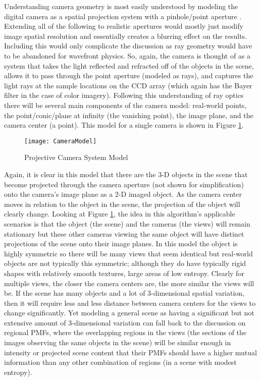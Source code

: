 Understanding camera geometry is most easily understood by modeling the digital camera as a spatial projection system with a pinhole/point aperture \cite{Hartley2003}. Extending all of the following to realistic apertures would mostly just modify image spatial resolution and essentially creates a blurring effect on the results. Including this would only complicate the discussion as ray geometry would have to be abandoned for wavefront physics. So, again, the camera is thought of as a system that takes the light reflected and refracted off of the objects in the scene, allows it to pass through the point aperture (modeled as rays), and captures the light rays at the sample locations on the CCD array (which again has the Bayer filter in the case of color imagery). Following this understanding of ray optics there will be several main components of the camera model: real-world points, the point/conic/plane at infinity (the vanishing point), the image plane, and the camera center (a point). This model for a single camera is shown in Figure \ref{CameraModel}.

\begin{figure}[h]
\centering
\texttt{[image: CameraModel]}
\caption{Projective Camera System Model}
\label{CameraModel}
\end{figure}


Again, it is clear in this model that there are the 3-D objects in the scene that become projected through the camera aperture (not shown for simplification) onto the camera's image plane as a 2-D imaged object. As the camera center moves in relation to the object in the scene, the projection of the object will clearly change. Looking at Figure \ref{CameraModel}, the idea in this algorithm's applicable scenarios is that the object (the scene) and the cameras (the views) will remain stationary but these other cameras viewing the same object will have distinct projections of the scene onto their image planes. In this model the object is highly symmetric so there will be many views that seem identical but real-world objects are not typically this symmetric; although they do have typically rigid shapes with relatively smooth textures, \ie{ }large areas of low entropy. Clearly for multiple views, the closer the camera centers are, the more similar the views will be. If the scene has many objects and a lot of 3-dimensional spatial variation, then it will require less and less distance between camera centers for the views to change significantly. Yet modeling a general scene as having a significant but not extensive amount of 3-dimensional variation can fall back to the discussion on regional PMFs, where the overlapping regions in the views (the sections of the images observing the same objects in the scene) will be similar enough in intensity or projected scene content that their PMFs should have a higher mutual information than any other combination of regions (in a scene with modest entropy).

